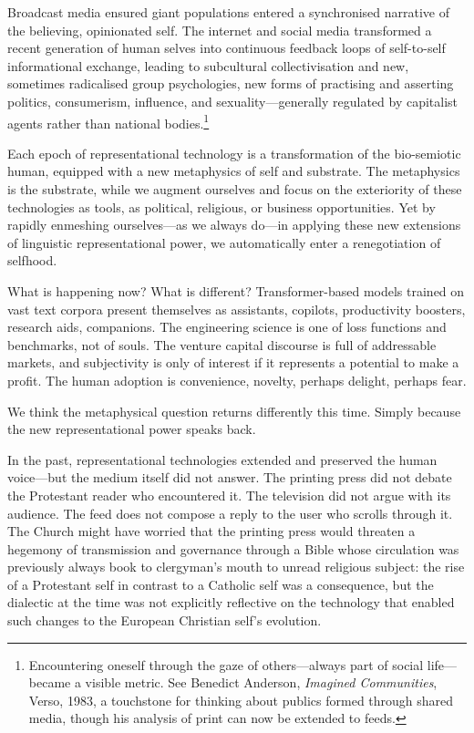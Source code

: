 Broadcast media ensured giant populations entered a synchronised narrative of the believing, opinionated self. The internet and social media transformed a recent generation of human selves into continuous feedback loops of self-to-self informational exchange, leading to subcultural collectivisation and new, sometimes radicalised group psychologies, new forms of practising and asserting politics, consumerism, influence, and sexuality---generally regulated by capitalist agents rather than national bodies.\footnote{Encountering oneself through the gaze of others---always part of social life---became a visible metric. See Benedict Anderson, \emph{Imagined Communities}, Verso, 1983, a touchstone for thinking about publics formed through shared media, though his analysis of print can now be extended to feeds.}

Each epoch of representational technology is a transformation of the bio-semiotic human, equipped with a new metaphysics of self and substrate. The metaphysics is the substrate, while we augment ourselves and focus on the exteriority of these technologies as tools, as political, religious, or business opportunities. Yet by rapidly enmeshing ourselves---as we always do---in applying these new extensions of linguistic representational power, we automatically enter a renegotiation of selfhood.

What is happening now? What is different? Transformer-based models trained on vast text corpora present themselves as assistants, copilots, productivity boosters, research aids, companions. The engineering science is one of loss functions and benchmarks, not of souls. The venture capital discourse is full of addressable markets, and subjectivity is only of interest if it represents a potential to make a profit. The human adoption is convenience, novelty, perhaps delight, perhaps fear.

We think the metaphysical question returns differently this time. Simply because the new representational power speaks back.

In the past, representational technologies extended and preserved the human voice---but the medium itself did not answer. The printing press did not debate the Protestant reader who encountered it. The television did not argue with its audience. The feed does not compose a reply to the user who scrolls through it. The Church might have worried that the printing press would threaten a hegemony of transmission and governance through a Bible whose circulation was previously always book to clergyman's mouth to unread religious subject: the rise of a Protestant self in contrast to a Catholic self was a consequence, but the dialectic at the time was not explicitly reflective on the technology that enabled such changes to the European Christian self's evolution.

